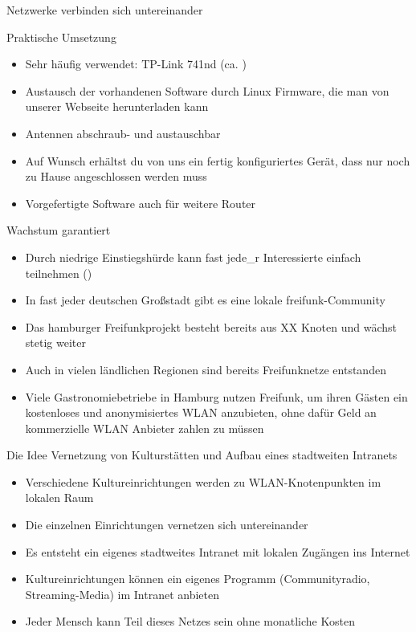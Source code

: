 \documentclass[aspectratio=43]{beamer}
\begin{document}
\begin{frame}{Netzwerke verbinden sich untereinander}

\end{frame}

\begin{frame}{Praktische Umsetzung}
	\begin{itemize}
		\item Sehr häufig verwendet: TP-Link 741nd (ca. )
		\item Austausch der vorhandenen Software durch Linux Firmware, die man von unserer Webseite herunterladen kann
		\item Antennen abschraub- und austauschbar
		\item Auf Wunsch erhältst du von uns ein fertig konfiguriertes Gerät, dass nur noch zu Hause angeschlossen werden muss
		\item Vorgefertigte Software auch für weitere Router
	\end{itemize}
\end{frame}

\begin{frame}{Wachstum garantiert}
	\begin{itemize}
		\item Durch niedrige Einstiegshürde kann fast jede\_r Interessierte einfach teilnehmen ()
		\item In fast jeder deutschen Großstadt gibt es eine lokale freifunk-Community
		\item Das hamburger Freifunkprojekt besteht bereits aus XX Knoten und wächst stetig weiter %
		\item Auch in vielen ländlichen Regionen sind bereits Freifunknetze entstanden
		\item Viele Gastronomiebetriebe in Hamburg nutzen Freifunk, um ihren Gästen ein kostenloses und anonymisiertes WLAN anzubieten, ohne dafür Geld an kommerzielle WLAN Anbieter zahlen zu müssen %
	\end{itemize}
\end{frame}

\begin{frame}{Die Idee}
	Vernetzung von Kulturstätten und Aufbau eines stadtweiten Intranets
	\begin{itemize}
		\item Verschiedene Kultureinrichtungen werden zu WLAN-Knotenpunkten im lokalen Raum
		\item Die einzelnen Einrichtungen vernetzen sich untereinander
		\item Es entsteht ein eigenes stadtweites Intranet mit lokalen Zugängen ins Internet
		\item Kultureinrichtungen können ein eigenes Programm (Communityradio, Streaming-Media) im Intranet anbieten
		\item Jeder Mensch kann Teil dieses Netzes sein ohne monatliche Kosten
	\end{itemize}
\end{frame}
\end{document}

